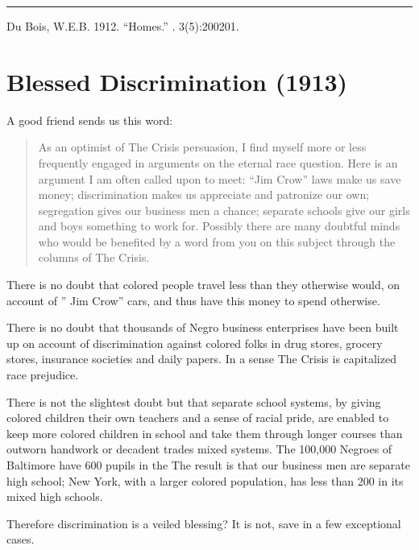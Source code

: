 \documentclass[letterpaper,10pt,english]{jupyterBook}
\begin{document}
\bigskip\hrule\bigskip


\sphinxAtStartPar
{} Du Bois, W.E.B. 1912. “Homes.”  . 3(5):200\sphinxhyphen{}201.


\section{Blessed Discrimination (1913)}
\label{\detokenize{Volumes/05/04/blesseddiscrimination:blessed-discrimination-1913}}\label{\detokenize{Volumes/05/04/blesseddiscrimination::doc}}
\sphinxAtStartPar
A good friend sends us this word:
\begin{quote}

\sphinxAtStartPar
As an optimist of The Crisis persuasion, I find myself more or less frequently engaged in arguments on the eternal race question. Here is an argument I am often called upon to meet: “Jim Crow” laws make us save money; discrimination makes us appreciate and patronize our own; segregation gives our business men a chance; separate schools give our girls and boys something to work for. Possibly there are many doubtful minds who would be benefited by a word from you on this subject through the columns of The Crisis.
\end{quote}

\sphinxAtStartPar
There is no doubt that colored people travel less than they otherwise would, on account of ” Jim Crow” cars, and thus have this money to spend otherwise.

\sphinxAtStartPar
There is no doubt that thousands of Negro business enterprises have been built up on account of discrimination against colored folks in drug stores, grocery stores, insurance societies and daily papers. In a sense The Crisis is capitalized race prejudice.

\sphinxAtStartPar
There is not the slightest doubt but that separate school systems, by giving colored children their own teachers and a sense of racial pride, are enabled to keep more colored children in school and take them through longer courses than outworn handwork or decadent trades mixed systems. The 100,000 Negroes of Baltimore have 600 pupils in the The result is that our business men are separate high school; New York, with a larger colored population, has less than 200 in its mixed high schools.

\sphinxAtStartPar
Therefore discrimination is a veiled blessing? It is not, save in a few exceptional cases.
\end{document}
